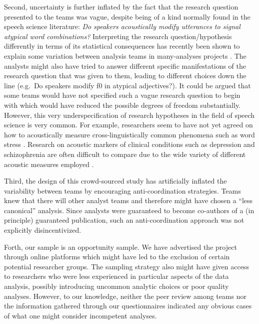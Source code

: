 \documentclass[Review,times,sageh]{sagej}
\begin{document}
Second, uncertainty is further inflated by the fact that the research question presented to the teams was vague, despite being of a kind normally found in the speech science literature: \emph{Do speakers acoustically modify utterances to signal atypical word combinations?}
Interpreting the research question/hypothesis differently in terms of its statistical consequences has recently been shown to explain some variation between analysis teams in many-analyses projects \citep{auspurg2021has}.
The analysts might also have tried to answer different specific manifestations of the research question that was given to them, leading to different choices down the line (e.g.~Do speakers modify f0 in atypical adjectives?).
It could be argued that some teams would have not specified such a vague research question to begin with which would have reduced the possible degrees of freedom substantially.
However, this very underspecification of research hypotheses in the field of speech science \citep[and beyond, see][]{scheel2022most} is very common.
For example, researchers seem to have not yet agreed on how to acoustically measure cross-linguistically common phenomena such as word stress \citep[e.g.][]{gordon2017acoustic}.
Research on acoustic markers of clinical conditions such as depression and schizophrenia are often difficult to compare due to the wide variety of different acoustic measures employed \citep[e.g.][]{cummins2015review, parola2022speech}.

Third, the design of this crowd-sourced study has artificially inflated the variability between teams by encouraging anti-coordination strategies.
Teams knew that there will other analyst teams and therefore might have chosen a ``less canonical'' analysis.
Since analysts were guaranteed to become co-authors of a (in principle) guaranteed publication, such an anti-coordination approach was not explicitly disincentivized.

Forth, our sample is an opportunity sample.
We have advertised the project through online platforms which might have led to the exclusion of certain potential researcher groups.
The sampling strategy also might have given access to researchers who were less experienced in particular aspects of the data analysis, possibly introducing uncommon analytic choices or poor quality analyses.
However, to our knowledge, neither the peer review among teams nor the information gathered through our questionnaires indicated any obvious cases of what one might consider incompetent analyses.
\end{document}
